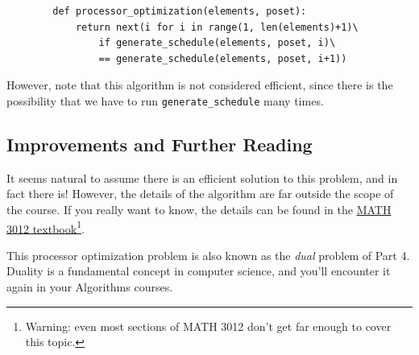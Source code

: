 \documentclass{article}
\begin{document}
    \begin{lstlisting}
        def processor_optimization(elements, poset):
            return next(i for i in range(1, len(elements)+1)\
                if generate_schedule(elements, poset, i)\
                == generate_schedule(elements, poset, i+1))
    \end{lstlisting}
    
    However, note that this algorithm is not considered efficient, since there is the possibility that we have to run \lstinline{generate_schedule} many times. 

    \subsection*{Improvements and Further Reading}
    It seems natural to assume there is an efficient solution to this problem, and in fact there is! However, the details of the algorithm are far outside the scope of the course. If you really want to know, the details can be found in the \href{https://www.appliedcombinatorics.org/book/s_flowapplications_chain-partition.html}{MATH 3012 textbook}\footnote{Warning: even most sections of MATH 3012 don't get far enough to cover this topic.}.
    
    
    \vspace{3mm} This processor optimization problem is also known as the \textit{dual} problem of Part 4. Duality is a fundamental concept in computer science, and you'll encounter it again in your Algorithms courses.



    


\end{document}
